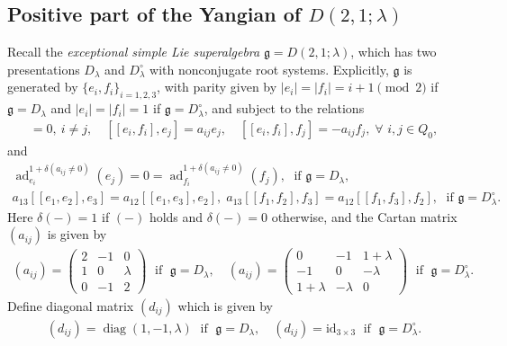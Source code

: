 \documentclass[10pt]{amsart}
\theoremstyle{definition}
\numberwithin{equation}{section}
\newcommand{\ad}{\operatorname{ad}}
\newcommand{\diag}{\operatorname{diag}}
\begin{document}
\subsection{Positive part of the Yangian of \texorpdfstring{$D(2,1;\lambda)$}{D(2,1;a)}}\label{sec Yangian for D(2,1;a)}

 
Recall the \textit{exceptional simple Lie superalgebra} $\mathfrak{g=}D(2,1;\lambda)$, which has two presentations $D_\lambda$ and $D^\circ_\lambda$ with nonconjugate root systems. Explicitly, $\mathfrak{g}$ is generated by $\{e_i,f_i\}_{i=1,2,3}$, with parity given by $|e_i|=|f_i|=i+1\pmod 2$ if $\mathfrak{g}=D_\lambda$ and $|e_i|=|f_i|=1$ if $\mathfrak{g}=D^\circ_\lambda$, and subject to the relations 
\begin{align*}
    [e_i,f_j]=0,\:i\neq j, \quad [[e_i,f_i],e_j]=a_{ij}e_j,\quad [[e_i,f_i],f_j]=-a_{ij}f_j,\;\forall \,\, i,j\in Q_0,
\end{align*}
and 
\begin{gather*}
\ad_{e_i}^{1+\delta(a_{ij}\neq 0)}(e_j)=0=\ad_{f_i}^{1+\delta(a_{ij}\neq 0)}(f_j),\; \text{ if }\mathfrak{g}=D_\lambda,\\
a_{13}[[e_1,e_2],e_3]=a_{12}[[e_1,e_3],e_2],\; a_{13}[[f_1,f_2],f_3]=a_{12}[[f_1,f_3],f_2],\; \text{ if }\mathfrak{g}=D^\circ_\lambda.
\end{gather*}
Here $\delta(-)=1$ if $(-)$ holds and $\delta(-)=0$ otherwise, and the Cartan matrix $(a_{ij})$ is given by
\begin{align}\label{Cartan matrix for D(2,1)}
(a_{ij})=
\begin{pmatrix}
2 & -1 & 0\\
1 & 0 & \lambda\\
0 & -1 & 2
\end{pmatrix}\; \text{ if }\;
\mathfrak{g}=D_\lambda, \quad (a_{ij})=
\begin{pmatrix}
0 & -1 & 1+\lambda\\
-1 & 0 & -\lambda\\
1+\lambda & -\lambda & 0
\end{pmatrix}\;\text{ if }\;\mathfrak{g}=D^\circ_\lambda.
\end{align}
Define diagonal matrix $(d_{ij})$ which is given by
\begin{align*}
(d_{ij})=\diag(1,-1,\lambda)\; \text{ if }\;
\mathfrak{g}=D_\lambda, \quad (d_{ij})=\mathrm{id}_{3\times 3}\;\text{ if }\;\mathfrak{g}=D^\circ_\lambda.
\end{align*}
\end{document}
